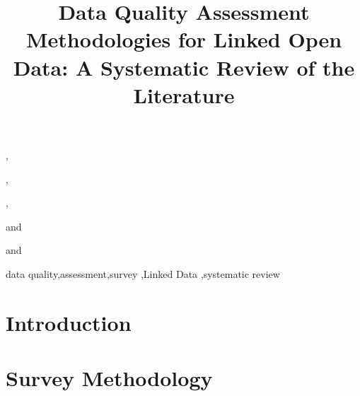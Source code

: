 \documentclass{iosart2c}
\begin{document}
\begin{frontmatter}                           %

\title{Data Quality Assessment Methodologies for Linked Open Data: A Systematic Review of the Literature}



\author[A]{ },
\author[B]{ },
\author[B]{ },
\author[C]{ } and
\author[A]{ } and
\author[A]{ }

\address[A]{Universit\"at Leipzig, Institut f\"ur Informatik, D-04103 Leipzig, Germany,\\
E-mail: (zaveri, lehmann, auer)@informatik.uni-leipzig.de}
\address[B]{University of Milano-Bicocca, Department of Computer Science, Systems and Communication (DISCo),\\ Innovative Techonologies for Interaction and Services (Lab), Viale Sarca 336, Milan, Italy\\
E-mail: (anisa.rula, maurino)@disco.unimib.it}
{\address[C]{Associate Professor and Vice Chair of Surgery, Duke University, Durham, NC, USA.,\\
E-mail: rpietro@duke.edu}}

\begin{abstract}

\end{abstract}

\begin{keyword}
data quality\sep assessment\sep survey \sep Linked Data \sep systematic review 
\end{keyword}

\end{frontmatter}

\section{Introduction}
\label{sec:intro}


\section{Survey Methodology}
\label{sec:method}

\end{document}
